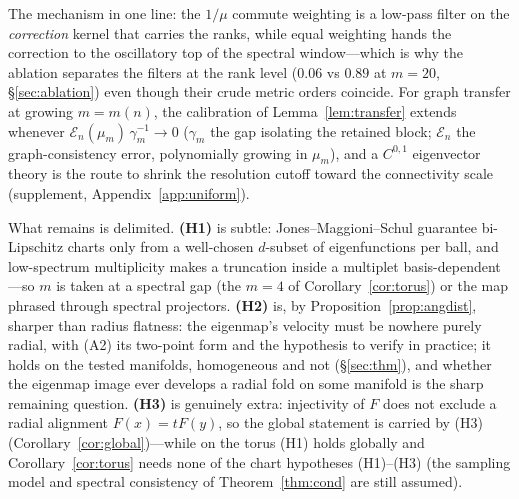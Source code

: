 \documentclass[11pt]{article}
\theoremstyle{remark}
\begin{document}
The mechanism in one line: the $1/\mu$ commute weighting is a low-pass filter
on the \emph{correction} kernel that carries the ranks, while equal weighting
hands the correction to the oscillatory top of the spectral window---which is
why the ablation separates the filters at the rank level ($0.06$ vs $0.89$ at
$m{=}20$, \S\ref{sec:ablation}) even though their crude metric orders coincide.
For graph transfer at growing $m=m(n)$, the calibration of
Lemma~\ref{lem:transfer} extends whenever
$\mathcal E_n(\mu_m)\,\gamma_m^{-1}\to0$ ($\gamma_m$ the gap isolating the
retained block; $\mathcal E_n$ the graph-consistency error, polynomially growing
in $\mu_m$), and a $C^{0,1}$ eigenvector theory \cite{calderlewicka2022} is the
route to shrink the resolution cutoff toward the connectivity scale (supplement,
Appendix~\ref{app:uniform}).

What remains is delimited. \textbf{(H1)} is subtle: Jones--Maggioni--Schul
\cite{jones2010} guarantee bi-Lipschitz charts only from a well-chosen
$d$-subset of eigenfunctions per ball, and low-spectrum multiplicity makes a
truncation inside a multiplet basis-dependent---so $m$ is taken at a spectral
gap (the $m{=}4$ of Corollary~\ref{cor:torus}) or the map phrased through
spectral projectors. \textbf{(H2)} is, by Proposition~\ref{prop:angdist},
sharper than radius flatness: the eigenmap's velocity must be nowhere purely
radial, with (A2) its two-point form and the hypothesis to verify in
practice; it holds on the tested manifolds, homogeneous and not (\S\ref{sec:thm}),
and whether the eigenmap image ever develops a radial fold on some manifold is the
sharp remaining question. \textbf{(H3)} is genuinely extra:
injectivity of $F$ \cite{portegies2016} does not exclude a radial alignment
$F(x)=tF(y)$, so the global statement is carried by (H3)
(Corollary~\ref{cor:global})---while on the torus (H1) holds globally and
Corollary~\ref{cor:torus} needs none of the chart hypotheses (H1)--(H3) (the
sampling model and spectral consistency of Theorem~\ref{thm:cond} are still assumed).
\end{document}
